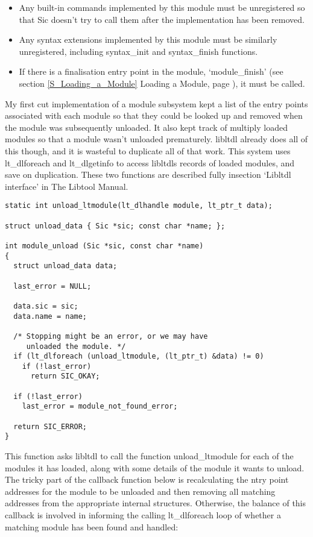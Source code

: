 \begin{itemize}
\item Any built-in commands implemented by this module must be unregistered so that Sic doesn't try to call them after the implementation has been removed.

\item Any syntax extensions implemented by this module must be similarly unregistered, including syntax\_{}init and syntax\_{}finish functions.

\item If there is a finalisation entry point in the module, `module\_{}finish'
(see section \ref{S_Loading_a_Module} Loading a Module,
page \pageref{S_Loading_a_Module}), it must be called.
\end{itemize}

My first cut implementation of a module subsystem kept a list of the entry points associated with each module so that they could be looked up and removed when the module was subsequently unloaded. It also kept track of multiply loaded modules so that a module wasn't unloaded prematurely. libltdl already does all of this though, and it is wasteful to duplicate all of that work. This system uses lt\_{}dlforeach and lt\_{}dlgetinfo to access libltdls records of loaded modules, and save on duplication. These two functions are described fully insection `Libltdl interface' in The Libtool Manual.

\begin{Verbatim}[frame=single]
static int unload_ltmodule(lt_dlhandle module, lt_ptr_t data);

struct unload_data { Sic *sic; const char *name; };

int module_unload (Sic *sic, const char *name)
{
  struct unload_data data;

  last_error = NULL;

  data.sic = sic;
  data.name = name;

  /* Stopping might be an error, or we may have 
     unloaded the module. */
  if (lt_dlforeach (unload_ltmodule, (lt_ptr_t) &data) != 0)
    if (!last_error)
      return SIC_OKAY;

  if (!last_error)
    last_error = module_not_found_error;
    
  return SIC_ERROR;
}
\end{Verbatim}

This function asks libltdl to call the function unload\_{}ltmodule for each of the modules it has loaded, along with some details of the module it wants to unload. The tricky part of the callback function below is recalculating the ntry point addresses for the module to be unloaded and then removing all matching addresses from the appropriate internal structures. Otherwise, the balance of this callback is involved in informing the calling lt\_{}dlforeach loop of whether a matching module has been found and handled:


